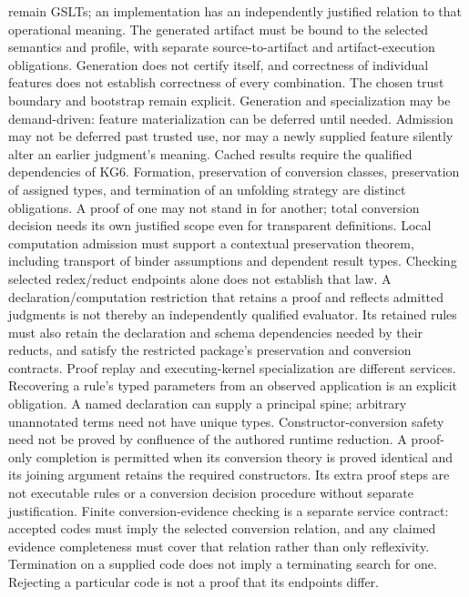 \documentclass[11pt]{article}
\theoremstyle{definition}
\theoremstyle{remark}
\begin{document}
\begin{description}[leftmargin=1.2cm,style=nextline]
  remain GSLTs; an implementation has an independently justified relation to
  that operational meaning. The generated artifact must be bound to the
  selected semantics and profile, with separate source-to-artifact and
  artifact-execution obligations. Generation does not certify itself, and
  correctness of individual features does not establish correctness of every
  combination. The chosen trust boundary and bootstrap remain explicit.
  Generation and specialization may be demand-driven: feature materialization
  can be deferred until needed. Admission may not be deferred past trusted use,
  nor may a newly supplied feature silently alter an earlier judgment's
  meaning. Cached results require the qualified dependencies of KG6.
  Formation, preservation of conversion classes, preservation of assigned
  types, and termination of an unfolding strategy are distinct obligations.
  A proof of one may not stand in for another; total conversion decision
  needs its own justified scope even for transparent definitions.
  Local computation admission must support a contextual preservation theorem,
  including transport of binder assumptions and dependent result types.
  Checking selected redex/reduct endpoints alone does not establish that law.
  A declaration/computation restriction that retains a proof and reflects
  admitted judgments is not thereby an independently qualified evaluator.
  Its retained rules must also retain the declaration and schema dependencies
  needed by their reducts, and satisfy the restricted package's preservation
  and conversion contracts. Proof replay and executing-kernel specialization
  are different services.
  Recovering a rule's typed parameters from an observed application is an
  explicit obligation. A named declaration can supply a principal spine;
  arbitrary unannotated terms need not have unique types.
  Constructor-conversion safety need not be proved by confluence of the
  authored runtime reduction. A proof-only completion is permitted when its
  conversion theory is proved identical and its joining argument retains the
  required constructors. Its extra proof steps are not executable rules or a
  conversion decision procedure without separate justification.
  Finite conversion-evidence checking is a separate service contract:
  accepted codes must imply the selected conversion relation, and any claimed
  evidence completeness must cover that relation rather than only reflexivity.
  Termination on a supplied code does not imply a terminating search for one.
  Rejecting a particular code is not a proof that its endpoints differ.

\end{description}
\end{document}
